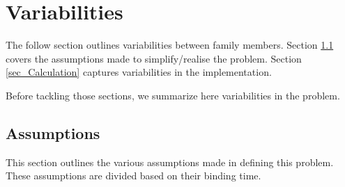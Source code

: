 \documentclass[12pt]{article}
\begin{document}
\section{Variabilities}
The follow section outlines variabilities between family members. Section 
\ref{sec_Assumptions} covers the assumptions made to simplify/realise the 
problem. Section \ref{sec_Calculation} captures variabilities in the 
implementation.

%

Before tackling those sections, we summarize here variabilities in the problem.

\subsection{Assumptions} \label{sec_Assumptions}
This section outlines the various assumptions made in defining this problem. 
These assumptions are divided based on their binding time.
\end{document}
